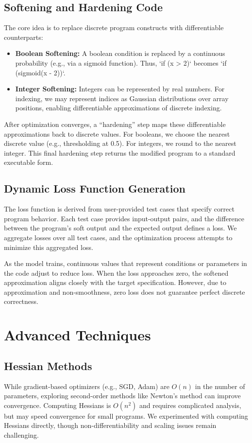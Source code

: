 \documentclass{article}
\begin{document}
\subsection{Softening and Hardening Code}
The core idea is to replace discrete program constructs with differentiable counterparts:
\begin{itemize}
    \item \textbf{Boolean Softening:} A boolean condition is replaced by a continuous probability (e.g., via a sigmoid function). Thus, `if (x > 2)` becomes `if (sigmoid(x - 2))`.
    \item \textbf{Integer Softening:} Integers can be represented by real numbers. For indexing, we may represent indices as Gaussian distributions over array positions, enabling differentiable approximations of discrete indexing.
\end{itemize}

After optimization converges, a ``hardening'' step maps these differentiable approximations back to discrete values. For booleans, we choose the nearest discrete value (e.g., thresholding at 0.5). For integers, we round to the nearest integer. This final hardening step returns the modified program to a standard executable form.

\subsection{Dynamic Loss Function Generation}
The loss function is derived from user-provided test cases that specify correct program behavior. Each test case provides input-output pairs, and the difference between the program's soft output and the expected output defines a loss. We aggregate losses over all test cases, and the optimization process attempts to minimize this aggregated loss.

As the model trains, continuous values that represent conditions or parameters in the code adjust to reduce loss. When the loss approaches zero, the softened approximation aligns closely with the target specification. However, due to approximation and non-smoothness, zero loss does not guarantee perfect discrete correctness.

\section{Advanced Techniques}

\subsection{Hessian Methods}
While gradient-based optimizers (e.g., SGD, Adam) are $O(n)$ in the number of parameters, exploring second-order methods like Newton's method can improve convergence. Computing Hessians is $O(n^2)$ and requires complicated analysis, but may speed convergence for small programs. We experimented with computing Hessians directly, though non-differentiability and scaling issues remain challenging.
\end{document}
